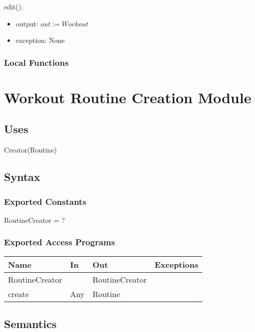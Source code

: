 \documentclass[12pt, titlepage]{article}
\begin{document}
\noindent edit():
\begin{itemize}
	\item output: $out := Workout$
	\item exception: None
\end{itemize}

\subsubsection{Local Functions}

\newpage

\section{Workout Routine Creation Module}

\subsection{Uses}

Creator(Routine)

\subsection{Syntax}

\subsubsection{Exported Constants}

RoutineCreator = ?

\subsubsection{Exported Access Programs}

\begin{center}
	\begin{tabular}{p{2cm} p{4cm} p{4cm} p{2cm}}
		\hline
		\textbf{Name} & \textbf{In} & \textbf{Out} & \textbf{Exceptions} \\
		\hline
		RoutineCreator &  & RoutineCreator &  \\
		create & Any & Routine &  \\
		\hline
	\end{tabular}
\end{center}

\subsection{Semantics}
\end{document}
